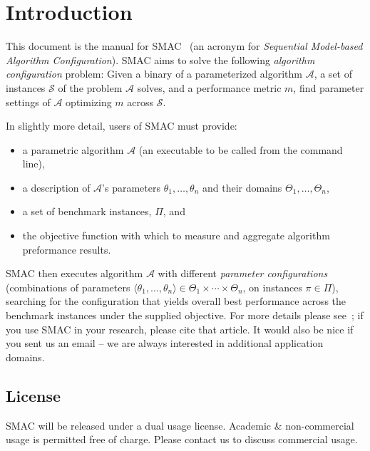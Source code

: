 \documentclass[manual.tex]{subfiles}
\begin{document}
\section{Introduction}\label{sec:intro}

This document is the manual for SMAC~\cite{HutHooLey11-SMAC} (an acronym for \emph{Sequential Model-based Algorithm Configuration}). SMAC aims to solve the following \emph{algorithm configuration} problem: Given a binary of a parameterized algorithm $\mathcal{A}$, a set of instances $\mathcal{S}$ of the problem $\mathcal{A}$ solves, and a performance metric $m$, find parameter settings of $\mathcal{A}$ optimizing $m$ across $\mathcal{S}$.

In slightly more detail, users of SMAC must provide:
\begin{itemize}
\item a parametric algorithm $\mathcal{A}$ (an executable to be called from
the command line), 
\item a description of $\mathcal{A}$'s parameters $\theta_1,\dots,\theta_n$ and their domains $\Theta_1, \dots, \Theta_n$, 
\item a set of benchmark instances, $\Pi$, and
\item the objective function with which to measure and aggregate algorithm preformance results.
\end{itemize}

SMAC then executes algorithm $\mathcal{A}$ with different \emph{parameter configurations} (combinations of parameters 
$\langle{}\theta_1,\dots,\theta_n\rangle{} \in \Theta_1 \times \cdots \times \Theta_n$, on instances $\pi \in \Pi$),
searching for the configuration that yields overall best performance across the benchmark instances under the supplied objective. For more details please see~\cite{HutHooLey11-SMAC}; if you use SMAC in your research, please cite that article. It would also be nice if you sent us an email -- we are always interested in additional application domains.

\subsection{License}

SMAC will be released under a dual usage license.  
Academic \& non-commercial usage is permitted free of charge. Please contact us to discuss commercial usage.
\end{document}
